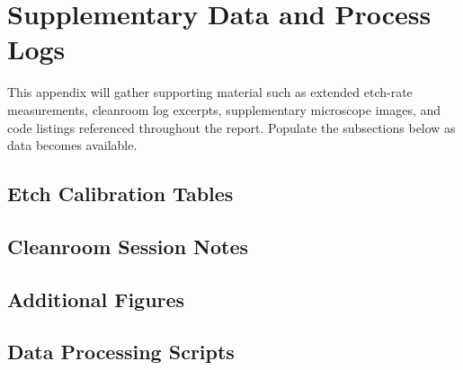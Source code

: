 \chapter{Supplementary Data and Process Logs}
\label{app:process-logs}

This appendix will gather supporting material such as extended etch-rate
measurements, cleanroom log excerpts, supplementary microscope images, and
code listings referenced throughout the report. Populate the subsections below
as data becomes available.

\section{Etch Calibration Tables}
\section{Cleanroom Session Notes}
\section{Additional Figures}
\section{Data Processing Scripts}
